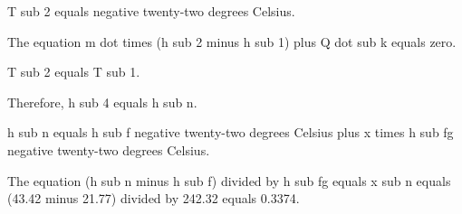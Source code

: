 T sub 2 equals negative twenty-two degrees Celsius.

The equation m dot times (h sub 2 minus h sub 1) plus Q dot sub k equals zero.

T sub 2 equals T sub 1.

Therefore, h sub 4 equals h sub n.

h sub n equals h sub f negative twenty-two degrees Celsius plus x times h sub fg negative twenty-two degrees Celsius.

The equation (h sub n minus h sub f) divided by h sub fg equals x sub n equals (43.42 minus 21.77) divided by 242.32 equals 0.3374.